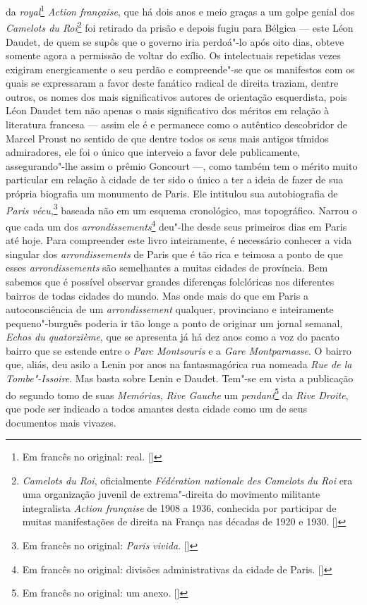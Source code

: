 da \emph{royal}\footnote{Em francês no original: real. []} \emph{Action française}, que há dois anos e meio graças a um golpe genial dos
\emph{Camelots du Roi}\footnote{\emph{Camelots du Roi},
  oficialmente \emph{Fédération nationale des Camelots du Roi} era uma
  organização juvenil de extrema"-direita do movimento militante
  integralista \emph{Action française} de 1908 a 1936, conhecida por
  participar de muitas manifestações de direita na França nas décadas de
  1920 e 1930. []} foi retirado da prisão e depois fugiu para Bélgica ---
este Léon Daudet, de quem se supôs que o governo iria perdoá"-lo após
oito dias, obteve somente agora a permissão de voltar do exílio. Os
intelectuais repetidas vezes exigiram energicamente o seu perdão e
compreende"-se que os manifestos com os quais se expressaram a favor
deste fanático radical de direita traziam, dentre outros, os nomes dos
mais significativos autores de orientação esquerdista, pois Léon Daudet
tem não apenas o mais significativo dos méritos em relação à literatura
francesa --- assim ele é e permanece como o autêntico descobridor de
Marcel Proust no sentido de que dentre todos os seus mais antigos
tímidos admiradores, ele foi o único que interveio a favor dele
publicamente, assegurando"-lhe assim o prêmio Goncourt ---, como também
tem o mérito muito particular em relação à cidade de ter sido o único a
ter a ideia de fazer de sua própria biografia um monumento de Paris. Ele
intitulou sua autobiografia de \emph{Paris vécu},\footnote{Em francês no original: \emph{Paris vivida}. []} baseada não em um esquema cronológico,
mas topográfico. Narrou o que cada um dos
\emph{arrondissements}\footnote{Em francês no original: divisões
  administrativas da cidade de Paris. []} deu"-lhe desde seus primeiros dias
em Paris até hoje. Para compreender este livro inteiramente, é
necessário conhecer a vida singular dos \emph{arrondissements} de Paris
que é tão rica e teimosa a ponto de que esses \emph{arrondissements} são semelhantes
a muitas cidades de província. Bem sabemos que é possível observar grandes
diferenças folclóricas nos diferentes bairros de todas cidades do mundo.
Mas onde mais do que em Paris a autoconsciência de um
\emph{arrondissement} qualquer, provinciano e inteiramente pequeno"-burguês poderia ir tão longe a ponto de originar um jornal semanal,
\emph{Echos du quatorzième}, que se apresenta já há dez anos como a voz
do pacato bairro que se estende entre o \emph{Parc Montsouris} e a
\emph{Gare Montparnasse}. O bairro que, aliás, deu asilo a Lenin por anos
na fantasmagórica rua nomeada \emph{Rue de la Tombe"-Issoire}. Mas basta
sobre Lenin e Daudet. Tem"-se em vista a publicação do segundo tomo de
suas \emph{Memórias}, \emph{Rive Gauche} um \emph{pendant}\footnote{Em francês no original: um anexo. []} da \emph{Rive Droite}, que pode ser
indicado a todos amantes desta cidade como um de seus documentos mais
vivazes.

